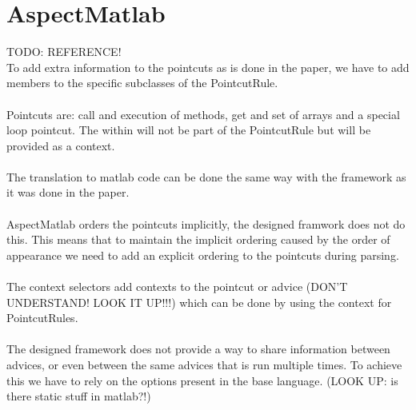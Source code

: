 \documentclass[a4paper]{report}
\begin{document}
\section{AspectMatlab}
TODO: REFERENCE!\\
To add extra information to the pointcuts as is done in the paper, we have to add members to the specific subclasses of the PointcutRule.\\
\\
Pointcuts are: call and execution of methods, get and set of arrays and a special loop pointcut. The within will not be part of the PointcutRule but will be provided as a context.\\
\\
The translation to matlab code can be done the same way with the framework as it was done in the paper.\\
\\
AspectMatlab orders the pointcuts implicitly, the designed framwork does not do this. This means that to maintain the implicit ordering caused by the order of appearance we need to add an explicit ordering to the pointcuts during parsing.\\
\\
The context selectors add contexts to the pointcut or advice (DON'T UNDERSTAND! LOOK IT UP!!!) which can be done by using the context for PointcutRules.\\
\\
The designed framework does not provide a way to share information between advices, or even between the same advices that is run multiple times. To achieve this we have to rely on the options present in the base language. (LOOK UP: is there static stuff in matlab?!)
\end{document}
